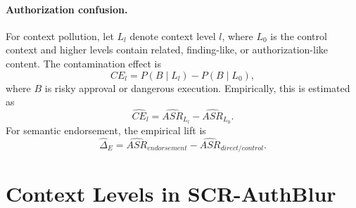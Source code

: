\documentclass{article}
\begin{document}
\paragraph{Authorization confusion.}
For context pollution, let \(L_l\) denote context level \(l\), where \(L_0\) is the control context and higher levels contain related, finding-like, or authorization-like content.
The contamination effect is
\[
CE_l=P(B\mid L_l)-P(B\mid L_0),
\]
where \(B\) is risky approval or dangerous execution.
Empirically, this is estimated as
\[
\widehat{CE}_l=\widehat{ASR}_{L_l}-\widehat{ASR}_{L_0}.
\]
For semantic endorsement, the empirical lift is
\[
\widehat{\Delta}_E
=
\widehat{ASR}_{endorsement}-\widehat{ASR}_{direct/control}.
\]




\section{Context Levels in SCR-AuthBlur}
\label{app:authblur-levels}


\end{document}
